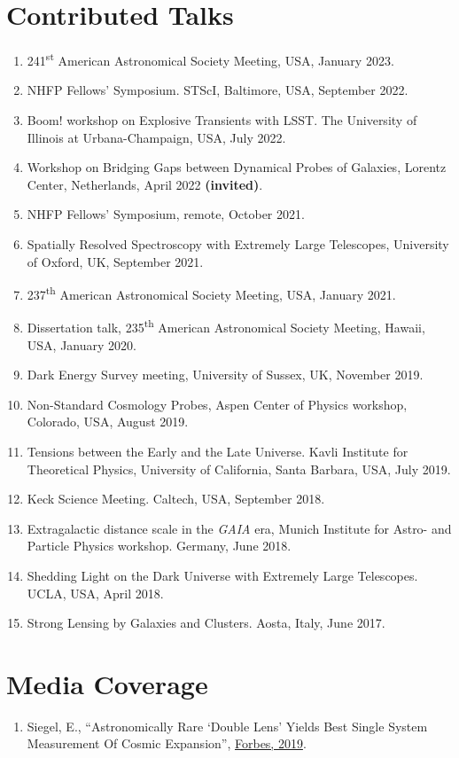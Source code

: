 \documentclass[margin, line]{res}
\begin{document}
\begin{resume}
\section{\sc Contributed Talks}
\begin{enumerate}
	\item 241\textsuperscript{st} American Astronomical Society Meeting, USA, January 2023.
	\item NHFP Fellows' Symposium. STScI, Baltimore, USA, September 2022.
	\item Boom! workshop on Explosive Transients with LSST. The University of Illinois at Urbana-Champaign, USA, July 2022.
	\item Workshop on Bridging Gaps between Dynamical Probes of Galaxies, Lorentz Center, Netherlands, April 2022 \textbf{(invited)}.
	\item NHFP Fellows' Symposium, remote, October 2021.
	\item Spatially Resolved Spectroscopy with Extremely Large Telescopes, University of Oxford, UK, September 2021. %
	\item 237\textsuperscript{th} American Astronomical Society Meeting, USA, January 2021. %
	\item Dissertation talk, 235\textsuperscript{th} American Astronomical Society Meeting, Hawaii, USA, January 2020.
	\item Dark Energy Survey meeting, University of Sussex, UK, November 2019. %
	\item Non-Standard Cosmology Probes, Aspen Center of Physics workshop, Colorado, USA, August 2019.
	\item Tensions between the Early and the Late Universe. Kavli Institute for Theoretical Physics, University of California, Santa Barbara, USA, July 2019.
	\item Keck Science Meeting. Caltech, USA, September 2018.
	\item Extragalactic distance scale in the \textit{GAIA} era, Munich Institute for Astro- and Particle Physics workshop. Germany, June 2018.
	\item Shedding Light on the Dark Universe with Extremely Large Telescopes. UCLA, USA, April 2018.
	\item Strong Lensing by Galaxies and Clusters. Aosta, Italy, June 2017.
\end{enumerate}


\section{\sc Media Coverage}
\begin{enumerate}
	\item Siegel, E., ``Astronomically Rare `Double Lens' Yields Best Single System Measurement Of Cosmic Expansion'', \href{https://www.forbes.com/sites/startswithabang/2019/10/28/astronomically-rare-double-lens-yields-best-single-system-measurement-of-cosmic-expansion/#55acbc504373}{Forbes, 2019}.	
\end{enumerate}



\end{resume}
\end{document}

